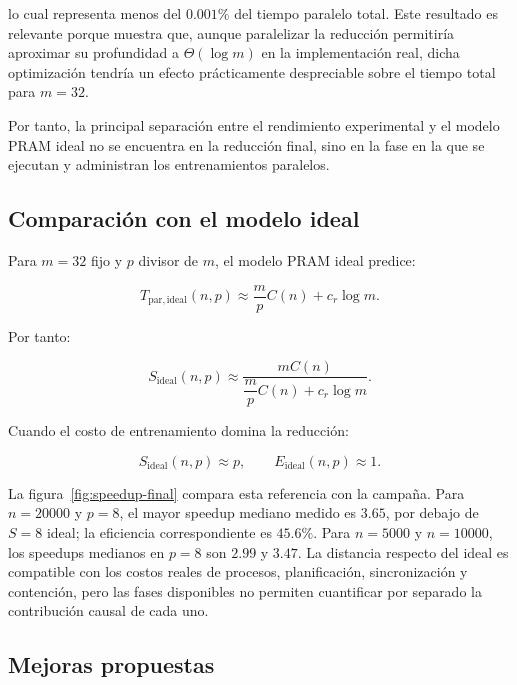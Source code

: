 \documentclass[11pt,a4paper]{article}
\newcommand{\Cost}{C}
\begin{document}
lo cual representa menos del $0.001\%$ del tiempo paralelo total. Este resultado
es relevante porque muestra que, aunque paralelizar la reducción permitiría
aproximar su profundidad a $\Theta(\log m)$ en la implementación real, dicha
optimización tendría un efecto prácticamente despreciable sobre el tiempo total
para $m=32$.

Por tanto, la principal separación entre el rendimiento experimental y el modelo
PRAM ideal no se encuentra en la reducción final, sino en la fase en la que se
ejecutan y administran los entrenamientos paralelos.

\subsection{Comparación con el modelo ideal}

Para $m=32$ fijo y $p$ divisor de $m$, el modelo PRAM ideal predice:

\begin{equation}
    T_{\mathrm{par,ideal}}(n,p)
    \approx
    \frac{m}{p}\Cost(n)
    +
    c_r\log m.
\end{equation}

Por tanto:

\begin{equation}
    S_{\mathrm{ideal}}(n,p)
    \approx
    \frac{m\Cost(n)}
         {\dfrac{m}{p}\Cost(n)+c_r\log m}.
\end{equation}

Cuando el costo de entrenamiento domina la reducción:

\begin{equation}
    S_{\mathrm{ideal}}(n,p)\approx p,
    \qquad
    E_{\mathrm{ideal}}(n,p)\approx1.
\end{equation}

La figura~\ref{fig:speedup-final} compara esta referencia con la campaña.
Para $n=20000$ y $p=8$, el mayor speedup mediano medido es $3.65$, por debajo
de $S=8$ ideal; la eficiencia correspondiente es $45.6\%$. Para $n=5000$ y
$n=10000$, los speedups medianos en $p=8$ son $2.99$ y $3.47$. La distancia
respecto del ideal es compatible con los costos reales de procesos,
planificación, sincronización y contención, pero las fases disponibles no
permiten cuantificar por separado la contribución causal de cada uno.

\subsection{Mejoras propuestas}
\end{document}
